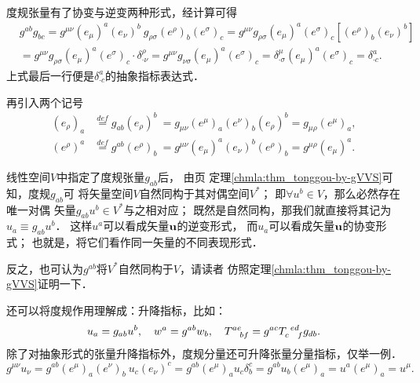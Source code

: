 度规张量有了协变与逆变两种形式，经计算可得
\begin{equation}
\begin{aligned}
    &g^{ab}g_{bc} = g^{\mu\nu} (e_\mu)^a (e_\nu)^b \ 
       g_{\rho\sigma} (e^\rho)_b (e^\sigma)_c
       =g^{\mu\nu}g_{\rho\sigma}(e_\mu)^a (e^\sigma)_c
       \left[(e^\rho)_b (e_\nu)^b \right] \\
    &= g^{\mu\nu}g_{\rho\sigma}(e_\mu)^a (e^\sigma)_c \cdot \delta^\rho _{\cdot \nu} 
     = g^{\mu\nu}g_{\nu\sigma}(e_\mu)^a (e^\sigma)_c 
    = \delta^\mu _{\cdot \sigma} (e_\mu)^a (e^\sigma)_c 
    = \delta^a_{\cdot c} .
\end{aligned}
\end{equation}
上式最后一行便是$\delta^a_{\cdot c}$的抽象指标表达式．

再引入两个记号
\begin{align}
	(e_\rho)_a &\overset{def}{=} g_{ab}(e_\rho)^b \
	= g_{\mu\nu}(e^\mu)_a (e^\nu)_b (e_\rho)^b
	= g_{\mu\rho}(e^\mu)_a, \\
	(e^\rho)^a &\overset{def}{=} g^{ab}(e^\rho)_b \
	= g^{\mu\nu}(e_\mu)^a (e_\nu)^b(e^\rho)_b
	= g^{\mu\rho}(e_\mu)^a .
\end{align}

线性空间$V$中指定了度规张量$g_{ab}$后，
由\pageref{chmla:thm_tonggou-by-gVVS}页
定理\ref{chmla:thm_tonggou-by-gVVS}可知，度规$g_{ab}$可
将矢量空间$V${\kaishu 自然同构}于其对偶空间$V^*$；
即$\forall u^b \in V$，那么必然存在唯一对偶
矢量$g_{ab}u^b\in V^*$与之相对应；
既然是自然同构，那我们就直接将其记为$u_a \equiv g_{ab}u^b$．
这样$u^a$可以看成矢量$\bf u$的逆变形式，
而$u_a$可以看成矢量$\bf u$的协变形式；
也就是，将它们看作同一矢量的不同表现形式．

反之，也可认为$g^{ab}$将$V^*${\kaishu 自然同构}于$V$，请读者
仿照定理\ref{chmla:thm_tonggou-by-gVVS}证明一下．

还可以将度规作用理解成：升降指标，比如：
\begin{equation*}
    u_a =g_{ab}u^b, \quad w^a=g^{ab}w_b, \quad
    T^{ae}_{\hphantom{ae} bf}=g^{ac}T^{\hphantom{c} ed}_{c \hphantom{ed} f}g_{db} .
\end{equation*}
除了对抽象形式的张量升降指标外，度规分量还可升降张量分量指标，仅举一例．
\begin{equation*}
    g^{\mu\nu} u_\nu = g^{ab} (e^\mu)_a (e^\nu)_b \ u_c (e_\nu)^c
    =g^{ab} (e^\mu)_a  u_c \delta^c_b
    =g^{ab} u_b (e^\mu)_a  = u^a(e^\mu)_a = u^\mu .
\end{equation*}

\index[physwords]{度规!抽象指标表示}


